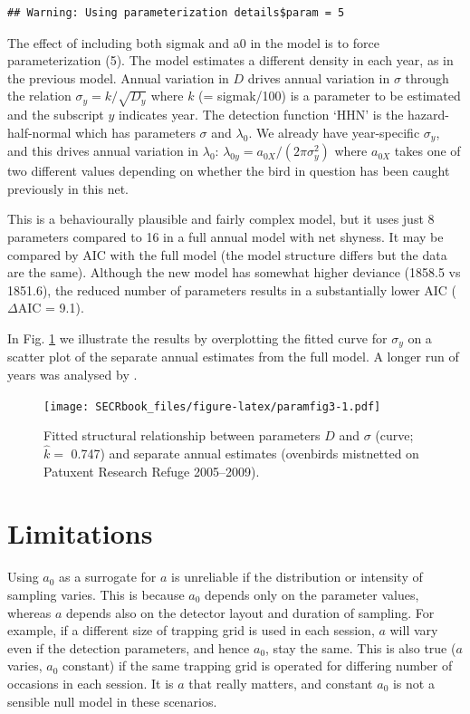 \documentclass[
]{book}
\begin{document}
\begin{verbatim}
## Warning: Using parameterization details$param = 5
\end{verbatim}

The effect of including both sigmak and a0 in the model is to force parameterization (5). The model estimates a different density in each year, as in the previous model. Annual variation in \(D\) drives annual variation in \(\sigma\) through the relation \(\sigma_y = k / \sqrt{D_y}\) where \(k\) (= sigmak/100) is a parameter to be estimated and the subscript \(y\) indicates year. The detection function `HHN' is the hazard-half-normal which has parameters \(\sigma\) and \(\lambda_0\). We already have year-specific \(\sigma_y\), and this drives annual variation in \(\lambda_0\): \(\lambda_{0y} = a_{0X} / (2 \pi \sigma_y^2)\) where \(a_{0X}\) takes one of two different values depending on whether the bird in question has been caught previously in this net.

This is a behaviourally plausible and fairly complex model, but it uses just 8 parameters compared to 16 in a full annual model with net shyness. It may be compared by AIC with the full model (the model structure differs but the data are the same). Although the new model has somewhat higher deviance (1858.5 vs 1851.6), the reduced number of parameters results in a substantially lower AIC (\(\Delta\)AIC =
9.1).

In Fig. \ref{fig:paramfig3} we illustrate the results by overplotting the fitted curve for \(\sigma_y\) on a scatter plot of the separate annual estimates from the full model. A longer run of years was analysed by \citet{edjq16}.



\begin{figure}
\centering
\texttt{[image: SECRbook\_files/figure-latex/paramfig3-1.pdf]}
\caption{\label{fig:paramfig3}Fitted structural relationship between parameters \(D\) and \(\sigma\) (curve; \(\hat k =\) 0.747) and separate annual estimates (ovenbirds mistnetted on Patuxent Research Refuge 2005--2009).}
\end{figure}

\section{Limitations}\label{paramlimitations}

Using \(a_0\) as a surrogate for \(a\) is unreliable if the distribution or intensity of sampling varies. This is because \(a_0\) depends only on the parameter values, whereas \(a\) depends also on the detector layout and duration of sampling. For example, if a different size of trapping grid is used in each session, \(a\) will vary even if the detection parameters, and hence \(a_0\), stay the same. This is also true (\(a\) varies, \(a_0\) constant) if the same trapping grid is operated for differing number of occasions in each session. It is \(a\) that really matters, and constant \(a_0\) is not a sensible null model in these scenarios.
\end{document}
